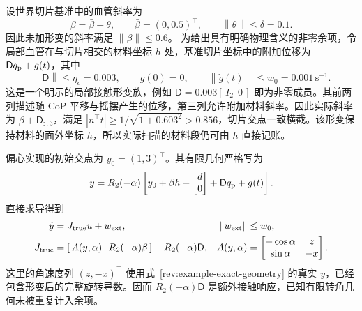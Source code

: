 \documentclass[11pt,a4paper]{article}
\numberwithin{equation}{section}
\theoremstyle{definition}
\newcommand{\norm}[1]{\left\lVert#1\right\rVert}
\begin{document}
设世界切片基准中的血管斜率为
\begin{equation}
 \beta=\bar\beta+\theta,\qquad
 \bar\beta=(0,0.5)^\top,\qquad \norm{\theta}\le\delta=0.1.
 \label{rev:example-slope}
\end{equation}
因此未加形变的斜率满足 $\norm{\beta}\le0.6$。
为给出具有明确物理含义的非零余项，令局部血管在与切片相交的材料坐标 $h$ 处，基准切片坐标中的附加位移为 $\mathsf Dq_{\rm p}+g(t)$，其中
\begin{equation}
 \norm{\mathsf D}\le\eta_c=0.003,
 \qquad g(0)=0,
 \qquad\norm{\dot g(t)}\le w_0=0.001\,\mathrm{s}^{-1}.
 \label{rev:example-contact-error}
\end{equation}
这是一个明示的局部接触形变族，例如
$\mathsf D=0.003[\,I_2\ \ 0\,]$ 即为非零成员。其前两列描述随 CoP 平移与摇摆产生的位移，第三列允许附加材料斜率。因此实际斜率为 $\beta+\mathsf D_{:,3}$，满足
$|n^\top t|\ge1/\sqrt{1+0.603^2}>0.856$，切片交点一致横截。该形变保持材料的面外坐标 $h$，所以实际扫描的材料段仍可由 $h$ 直接记账。

偏心实现的初始交点为 $y_0=(1,3)^\top$。其有限几何严格写为
\begin{equation}
 y=R_2(-\alpha)
 \left[y_0+\beta h-\begin{bmatrix}d\\0\end{bmatrix}
       +\mathsf Dq_{\rm p}+g(t)\right].
 \label{rev:example-exact-geometry}
\end{equation}
直接求导得到
\begin{align}
 \dot y&=J_{\rm true}u+w_{\rm ext},
 &\norm{w_{\rm ext}}&\le w_0,\nonumber\\
 J_{\rm true}&=
 \left[\,A(y,\alpha)\ \ R_2(-\alpha)\beta\,\right]
             +R_2(-\alpha)\mathsf D,
 &A(y,\alpha)&=
 \begin{bmatrix}-\cos\alpha&z\\ \sin\alpha&-x\end{bmatrix}.
 \label{rev:example-exact-jacobian}
\end{align}
这里的角速度列 $(z,-x)^\top$ 使用式~\eqref{rev:example-exact-geometry} 的真实 $y$，已经包含形变后的完整旋转导数。因而 $R_2(-\alpha)\mathsf D$ 是额外接触响应，已知有限转角几何未被重复计入余项。
\end{document}
